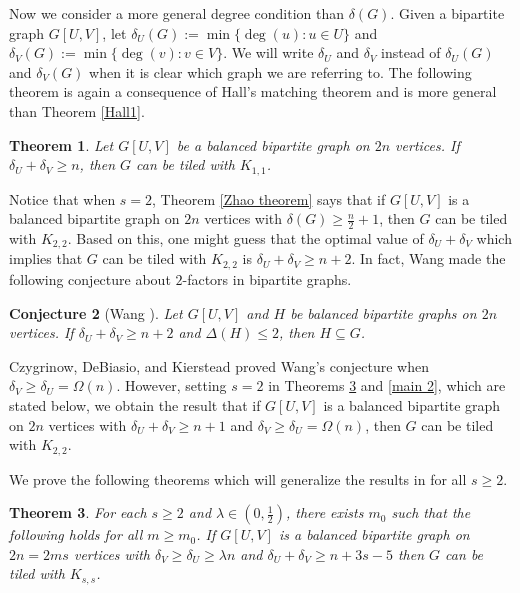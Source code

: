 \documentclass[oneside,12pt]{memoir}
\newtheorem{theorem}{Theorem}[section]
\newtheorem{conjecture}[theorem]{Conjecture}
\begin{document}
Now we consider a more general degree condition than $\delta(G)$.  Given a bipartite graph $G[U,V]$, let $\delta_U(G):=\min\{\deg(u): u\in U\}$ and $\delta_V(G):=\min\{\deg(v): v\in V\}$.  We will write $\delta_U$ and $\delta_V$ instead of $\delta_U(G)$ and $\delta_V(G)$ when it is clear which graph we are referring to.  The following theorem is again a consequence of Hall's matching theorem and is more general than Theorem \ref{Hall1}.

\begin{theorem}\label{Hall2}
Let $G[U,V]$ be a balanced bipartite graph on $2n$ vertices.  If $\delta_U+\delta_V\geq n$, then $G$ can be tiled with $K_{1,1}$.
\end{theorem}

Notice that when $s=2$, Theorem \ref{Zhao theorem} says that if $G[U,V]$ is a balanced bipartite graph on $2n$ vertices with $\delta(G)\geq \frac{n}{2}+1$, then $G$ can be tiled with $K_{2,2}$.  Based on this, one might guess that the optimal value of $\delta_U+\delta_V$ which implies that $G$ can be tiled with $K_{2,2}$ is $\delta_U+\delta_V\geq n+2$.   In fact, Wang made the following conjecture about $2$-factors in bipartite graphs.

\begin{conjecture}[Wang \cite{W2}]
\label{con:W2}
Let $G[U,V]$ and $H$ be balanced bipartite graphs on $2n$ vertices.  If $\delta_U+\delta_V\geq n+2$ and $\Delta(H)\leq 2$, then $H\subseteq G$.
\end{conjecture}

Czygrinow, DeBiasio, and Kierstead \cite{CDK} proved Wang's conjecture when $\delta_V\geq \delta_U=\Omega(n)$.  However, setting $s=2$ in Theorems \ref{main 1} and \ref{main 2}, which are stated below, we obtain the result that if $G[U,V]$ is a balanced bipartite graph on $2n$ vertices with $\delta_U+\delta_V\geq n+1$ and $\delta_V\geq \delta_U=\Omega(n)$, then $G$ can be tiled with $K_{2,2}$.

We prove the following theorems which will generalize the results in \cite{Z} for all $s\geq 2$.%

\begin{theorem}\label{main 1}
For each $s\geq 2$ and $\lambda\in (0,\frac{1}{2})$, there exists $m_0$ such that the following holds for all $m\geq m_0$.  If $G[U,V]$ is a balanced bipartite graph on $2n=2ms$ vertices with $\delta_V\geq\delta_U\geq \lambda n$ and $\delta_U+\delta_V\geq n+3s-5$
then $G$ can be tiled with $K_{s,s}$.
\end{theorem}
\end{document}
